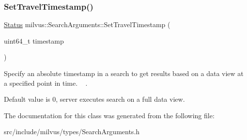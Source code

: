 \subsubsection{\texorpdfstring{Set\+Travel\+Timestamp()}{SetTravelTimestamp()}}
{\footnotesize\ttfamily \hyperlink{classmilvus_1_1_status}{Status} milvus\+::\+Search\+Arguments\+::\+Set\+Travel\+Timestamp (\begin{DoxyParamCaption}\item[{uint64\+\_\+t}]{timestamp }\end{DoxyParamCaption})\hspace{0.3cm}{\ttfamily [inline]}}



Specify an absolute timestamp in a search to get results based on a data view at a specified point in time. ~\newline
. 

Default value is 0, server executes search on a full data view. 

The documentation for this class was generated from the following file\+:\begin{DoxyCompactItemize}
\item 
src/include/milvus/types/Search\+Arguments.\+h\end{DoxyCompactItemize}
